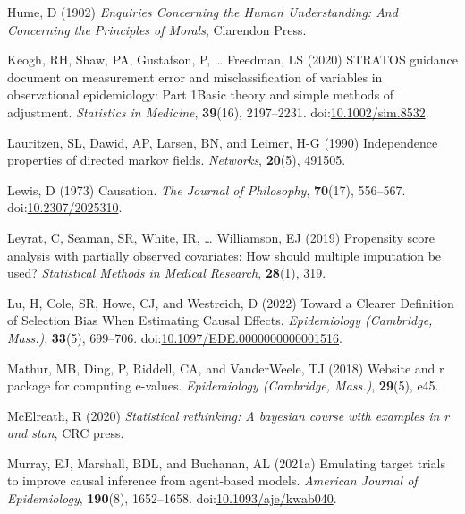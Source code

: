 \documentclass[
  singlecolumn]{article}
\newlength{\cslhangindent}
\newlength{\cslentryspacingunit} %
\newenvironment{CSLReferences}[2] %
 {%
  \setlength{\parindent}{0pt}
  \ifodd #1
  \let\oldpar\par
  \def\par{\hangindent=\cslhangindent\oldpar}
  \fi
  \setlength{\parskip}{#2\cslentryspacingunit}
 }%
 {}
\begin{document}
\begin{CSLReferences}{1}{0}
\leavevmode{}%
Hume, D (1902) \emph{Enquiries Concerning the Human Understanding: And
Concerning the Principles of Morals}, Clarendon Press.

\leavevmode{}%
Keogh, RH, Shaw, PA, Gustafson, P, \ldots{} Freedman, LS (2020) STRATOS
guidance document on measurement error and misclassification of
variables in observational epidemiology: Part 1{\textemdash}Basic theory
and simple methods of adjustment. \emph{Statistics in Medicine},
\textbf{39}(16), 2197--2231.
doi:\href{https://doi.org/10.1002/sim.8532}{10.1002/sim.8532}.

\leavevmode{}%
Lauritzen, SL, Dawid, AP, Larsen, BN, and Leimer, H-G (1990)
Independence properties of directed markov fields. \emph{Networks},
\textbf{20}(5), 491505.

\leavevmode{}%
Lewis, D (1973) Causation. \emph{The Journal of Philosophy},
\textbf{70}(17), 556--567.
doi:\href{https://doi.org/10.2307/2025310}{10.2307/2025310}.

\leavevmode{}%
Leyrat, C, Seaman, SR, White, IR, \ldots{} Williamson, EJ (2019)
Propensity score analysis with partially observed covariates: How should
multiple imputation be used? \emph{Statistical Methods in Medical
Research}, \textbf{28}(1), 319.

\leavevmode{}%
Lu, H, Cole, SR, Howe, CJ, and Westreich, D (2022) Toward a Clearer
Definition of Selection Bias When Estimating Causal Effects.
\emph{Epidemiology (Cambridge, Mass.)}, \textbf{33}(5), 699--706.
doi:\href{https://doi.org/10.1097/EDE.0000000000001516}{10.1097/EDE.0000000000001516}.

\leavevmode{}%
Mathur, MB, Ding, P, Riddell, CA, and VanderWeele, TJ (2018) Website and
r package for computing e-values. \emph{Epidemiology (Cambridge,
Mass.)}, \textbf{29}(5), e45.

\leavevmode{}%
McElreath, R (2020) \emph{Statistical rethinking: A bayesian course with
examples in r and stan}, CRC press.

\leavevmode{}%
Murray, EJ, Marshall, BDL, and Buchanan, AL (2021a) Emulating target
trials to improve causal inference from agent-based models.
\emph{American Journal of Epidemiology}, \textbf{190}(8), 1652--1658.
doi:\href{https://doi.org/10.1093/aje/kwab040}{10.1093/aje/kwab040}.


\end{CSLReferences}
\end{document}
